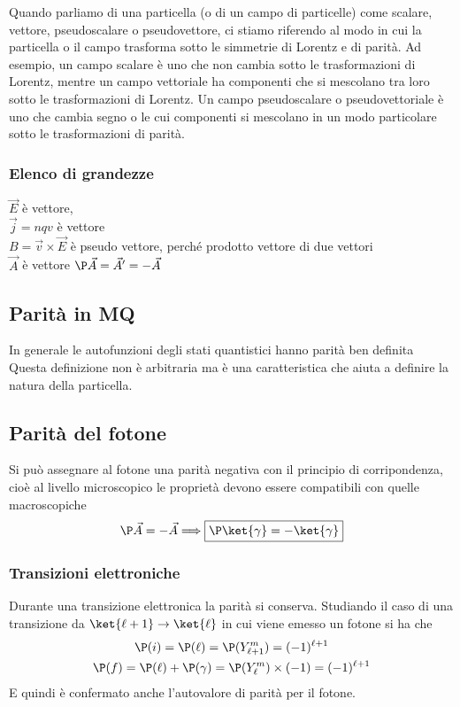 \documentclass[12pt]{book}
\begin{document}
Quando parliamo di una particella (o di un campo di particelle) come scalare, vettore, pseudoscalare o pseudovettore, ci stiamo riferendo al modo in cui la particella o il campo trasforma sotto le simmetrie di Lorentz e di parità. Ad esempio, un campo scalare è uno che non cambia sotto le trasformazioni di Lorentz, mentre un campo vettoriale ha componenti che si mescolano tra loro sotto le trasformazioni di Lorentz. Un campo pseudoscalare o pseudovettoriale è uno che cambia segno o le cui componenti si mescolano in un modo particolare sotto le trasformazioni di parità.

\subsubsection{Elenco di grandezze}
$\vec E $ è vettore, \\
$\vec j = nqv$ è vettore\\
$B= \vec v \times \vec E$ è pseudo vettore, perché prodotto vettore di due vettori\\
$\vec A$ è vettore $\P \vec A = \vec A' = - \vec A$\\


\subsection{Parità in MQ}
In generale le autofunzioni degli stati quantistici hanno parità ben definita Questa definizione non è arbitraria ma è una caratteristica che aiuta a definire la natura della particella. 

\subsection{Parità del fotone}
Si può assegnare al fotone una parità negativa con il principio di corripondenza, cioè al livello microscopico le proprietà devono essere compatibili con quelle macroscopiche
\begin{gather}
	\P \vec A = - \vec A \Longrightarrow \boxed{\P \ket{\gamma} =- \ket{\gamma}}
\end{gather}

\subsubsection{Transizioni elettroniche}
Durante una transizione elettronica la parità si conserva. Studiando il caso di una transizione da $\ket{\ell+1} \rightarrow \ket{\ell}$ in cui viene emesso un fotone si ha che
\begin{gather}
	\P(i) = \P(\ell) = \P (Y_{\ell+1}^m) = (-1)^{\ell+1}\\
	\P(f) = \P(\ell) + \P (\gamma)= \P (Y_\ell^m) \times (-1)= (-1)^{\ell+1}
\end{gather}
E quindi è confermato anche l'autovalore di parità per il fotone.
\end{document}
